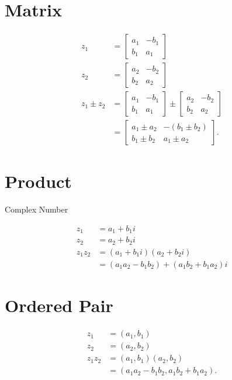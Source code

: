 \documentclass[10pt]{article}
\begin{document}
\section{Matrix}
$$
\begin{aligned}
z_{1} & =\left[\begin{array}{ll}
a_{1} & -b_{1} \\
b_{1} & a_{1}
\end{array}\right] \\
z_{2} & =\left[\begin{array}{cc}
a_{2} & -b_{2} \\
b_{2} & a_{2}
\end{array}\right] \\
z_{1} \pm z_{2} & =\left[\begin{array}{cc}
a_{1} & -b_{1} \\
b_{1} & a_{1}
\end{array}\right] \pm\left[\begin{array}{cc}
a_{2} & -b_{2} \\
b_{2} & a_{2}
\end{array}\right] \\
& =\left[\begin{array}{cc}
a_{1} \pm a_{2} & -\left(b_{1} \pm b_{2}\right) \\
b_{1} \pm b_{2} & a_{1} \pm a_{2}
\end{array}\right] .
\end{aligned}
$$

\section{Product}
Complex Number

$$
\begin{aligned}
z_{1} & =a_{1}+b_{1} i \\
z_{2} & =a_{2}+b_{2} i \\
z_{1} z_{2} & =\left(a_{1}+b_{1} i\right)\left(a_{2}+b_{2} i\right) \\
& =\left(a_{1} a_{2}-b_{1} b_{2}\right)+\left(a_{1} b_{2}+b_{1} a_{2}\right) i
\end{aligned}
$$

\section{Ordered Pair}
$$
\begin{aligned}
z_{1} & =\left(a_{1}, b_{1}\right) \\
z_{2} & =\left(a_{2}, b_{2}\right) \\
z_{1} z_{2} & =\left(a_{1}, b_{1}\right)\left(a_{2}, b_{2}\right) \\
& =\left(a_{1} a_{2}-b_{1} b_{2}, a_{1} b_{2}+b_{1} a_{2}\right) .
\end{aligned}
$$
\end{document}
